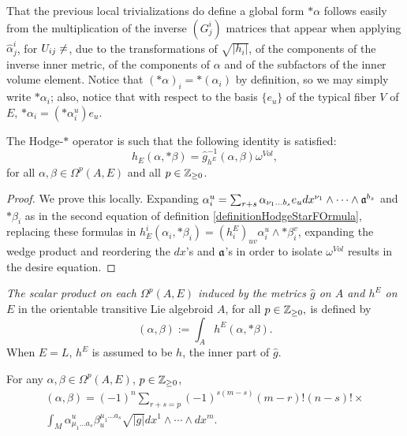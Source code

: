That the previous local trivializations do define a global form $*\alpha$ follows easily from the multiplication of the inverse $(G^i_j)$ matrices that appear when applying $\hat \alpha^i_j$, for $U_{ij} \neq \empty$, due to the transformations of $\sqrt{|h_i|}$, of the components of the inverse inner metric, of the components of $\alpha$ and of the subfactors of the inner volume element. Notice that $(*\alpha)_i = *(\alpha_i)$ by definition, so we may simply write $*\alpha_i$; also, notice that with respect to the basis $\{e_u\}$ of the typical fiber $V$ of $E$, $*\alpha_i = (*\alpha_i^u)e_u$.

\begin{proposition}
The Hodge-$*$ operator is such that the following identity is satisfied:
\begin{equation}
    h_E(\alpha, *\beta) = \hat g_{h^E}^{-1}(\alpha, \beta) \omega^{Vol},
\end{equation}
for all $\alpha, \beta \in \Omega^p(A, E)$ and all $p \in \mathbb{Z}_{\geq 0}$.
\end{proposition}

\begin{proof}
We prove this locally. Expanding $\alpha_i^u = \sum_{r+s} \alpha_{\nu_1 \dots b_s} e_u dx^{\nu_1} \wedge \cdots \wedge \mathfrak{a}^{b_s}$ and $*\beta_i$ as in the second equation of definition \ref{definitionHodgeStarFOrmula}, replacing these formulas in $h^i_E(\alpha_i, *\beta_i) = (h^E_i)_{uv} \alpha_i^u \wedge * \beta_i^v$, expanding the wedge product and reordering the $dx$'s and $\mathfrak{a}$'s in order to isolate $\omega^{Vol}$ results in the desire equation. 
\end{proof}

\begin{definition}
\emph{The scalar product on each $\Omega^p(A, E)$ induced by the metrics $\hat g$ on $A$ and $h^E$ on $E$} in the orientable transitive Lie algebroid $A$, for all $p \in \mathbb{Z}_{\geq 0},$ is defined by
\begin{equation*}
    (\alpha, \beta) := \int_A h^E(\alpha, *\beta).
\end{equation*}
When $E = L$, $h^E$ is assumed to be $h$, the inner part of $\hat g$.
\end{definition}

\begin{theorem}\label{theoremDecompositionOfScalarProductOfHomogeneousFormsForLagrangian}
For any $\alpha, \beta \in \Omega^p(A, E)$, $p \in \mathbb{Z}_{\geq 0}$,
\begin{multline*}
    (\alpha, \beta) = (-1)^n \sum_{r + s = p} (-1)^{s(m-s)} (m-r)! (n-s)! \times \\
    \int_M \alpha^u_{\mu_1 \dots a_s} \beta_u^{\mu_1 \dots a_s} \sqrt{|g|} dx^1 \wedge \cdots \wedge dx^m. 
\end{multline*}
\end{theorem}